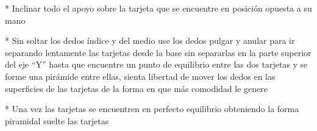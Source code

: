 \documentclass{article}
\begin{document}
*	Inclinar todo el apoyo sobre la tarjeta que se encuentre en posición opuesta a su mano

*	Sin soltar los dedos índice y del medio use los dedos pulgar y anular para ir separando lentamente las tarjetas desde la base sin separarlas en la parte superior del eje “Y” hasta que encuentre un punto de equilibrio entre las dos tarjetas y se forme una pirámide entre ellas, sienta libertad de mover los dedos en las superficies de las tarjetas de la forma en que más comodidad le genere

*	Una vez las tarjetas se encuentren en perfecto equilibrio obteniendo la forma piramidal suelte las tarjetas
\end{document}
